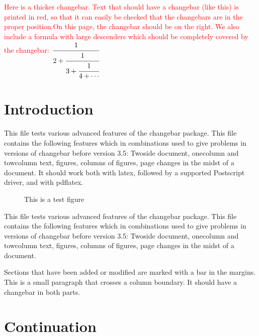 \documentclass[12pt,twoside]{article}
\begin{document}
\cbstart[3mm] \textcolor{red}{Here is a thicker changebar. Text that should
  have a changebar (like this) is printed in red, so that it can easily be
  checked that the changebars are in the proper position.On this page, the
  changebar should be on the right. We also include a formula with large
  descenders which should be completely covered by the changebar:
  $\displaystyle \cfrac{1}{2+\cfrac{1}{3+\cfrac{1}{4+\cdots}}}$
  \cbend}

\twocolumn
{}

\section{Introduction}

\cbstart
\color{red}
This file tests various advanced features of the changebar package.
This file contains the following features which in combinations used to
give problems in  versions of changebar before version 3.5:
Twoside document, onecolumn and towcolumn text, figures, columns of
figures, page changes in the midst of a document.
It should work both with latex, followed by a supported Postscript driver,
and with pdflatex.
\cbend
\color{black}

\begin{figure}
  \centering 
  \cbstart \color{red} 
  \color{black} 
  \caption{This is a test figure}
\end{figure}

This file tests various advanced features of the changebar package.
This file contains the following features which in combinations used to
give problems in  versions of changebar before version 3.5:
Twoside document, onecolumn and towcolumn text, figures, columns of
figures, page changes in the midst of a document.

\cbstart
\color{red}
Sections that have been added or modified are marked with a bar in
the  margins. This is a small paragraph that crosses a column boundary. It
should have a changebar in both parts.\cbend
\color{black}

\section{Continuation}
\cbstart
\color{red}
\end{document}

